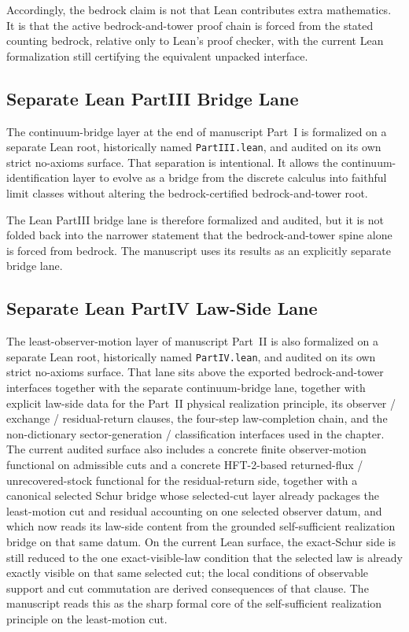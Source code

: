 Accordingly, the bedrock claim is not that Lean contributes extra mathematics.
It is that the active bedrock-and-tower proof chain is forced from the stated
counting bedrock, relative only to Lean's proof checker, with the current Lean
formalization still certifying the equivalent unpacked interface.

\subsection{Separate Lean PartIII Bridge Lane}
\label{subsec:formal-part3-lane}

The continuum-bridge layer at the end of manuscript Part~I is formalized on
a separate Lean root, historically named \texttt{PartIII.lean}, and audited on
its own strict no-axioms surface. That separation is intentional. It allows
the continuum-identification layer to evolve as a bridge from the discrete
calculus into faithful limit classes without altering the bedrock-certified
bedrock-and-tower root.

The Lean PartIII bridge lane is therefore formalized and audited, but it is
not folded back into the narrower statement that the bedrock-and-tower spine
alone is forced from bedrock. The manuscript uses its results as an explicitly
separate bridge lane.

\subsection{Separate Lean PartIV Law-Side Lane}
\label{subsec:formal-part4-lane}

The least-observer-motion layer of manuscript Part~II is also formalized on a
separate Lean root, historically named \texttt{PartIV.lean}, and audited on
its own strict no-axioms surface. That lane sits above the exported
bedrock-and-tower interfaces together with the separate continuum-bridge lane,
together with explicit law-side data for the Part~II physical realization
principle, its observer / exchange / residual-return clauses, the four-step
law-completion chain, and the
non-dictionary sector-generation / classification interfaces used in the
chapter. The current audited surface also includes a concrete finite
observer-motion functional on admissible cuts and a concrete HFT-2-based
returned-flux / unrecovered-stock functional for the residual-return side,
together with a canonical selected Schur bridge whose selected-cut layer
already packages the least-motion cut and residual accounting on one selected
observer datum, and which now reads its law-side content from the grounded
self-sufficient realization bridge on that same datum. On the current Lean
surface, the exact-Schur side is still reduced to the one exact-visible-law
condition that the selected law is already exactly visible on that same
selected cut; the local conditions of observable support and cut commutation
are derived consequences of that clause. The manuscript reads this as the
sharp formal core of the self-sufficient realization principle on the
least-motion cut.

